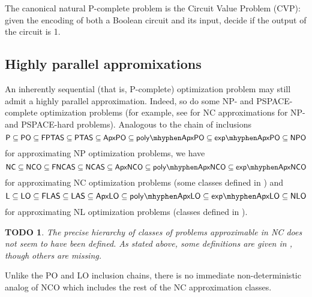 \documentclass{article}
\newtheorem{todo}{TODO}
\begin{document}
The canonical natural \textsf{P}-complete problem is the Circuit Value Problem (CVP): given the encoding of both a Boolean circuit and its input, decide if the output of the circuit is 1.

\subsection{Highly parallel appromixations}

An inherently sequential (that is, \textsf{P}-complete) optimization problem may still admit a highly parallel approximation.
Indeed, so do some \textsf{NP}- and \textsf{PSPACE}-complete optimization problems (for example, see \cite{hmrrrs98} for \textsf{NC} approximations for \textsf{NP}- and \textsf{PSPACE}-hard problems).
Analogous to the chain of inclusions
\begin{displaymath}
  \mathsf{P} \subseteq \mathsf{PO} \subseteq \mathsf{FPTAS} \subseteq \mathsf{PTAS} \subseteq \mathsf{ApxPO} \subseteq \mathsf{poly\mhyphen ApxPO} \subseteq \mathsf{exp\mhyphen ApxPO} \subseteq \mathsf{NPO}
\end{displaymath}
for approximating \textsf{NP} optimization problems, we have
\begin{displaymath}
  \mathsf{NC} \subseteq \mathsf{NCO} \subseteq \mathsf{FNCAS} \subseteq \mathsf{NCAS} \subseteq \mathsf{ApxNCO} \subseteq \mathsf{poly\mhyphen ApxNCO} \subseteq \mathsf{exp\mhyphen ApxNCO}
\end{displaymath}
for approximating \textsf{NC} optimization problems (some classes defined in \cite{dsst97}) and
\begin{displaymath}
  \mathsf{L} \subseteq \mathsf{LO} \subseteq \mathsf{FLAS} \subseteq \mathsf{LAS} \subseteq \mathsf{ApxLO} \subseteq \mathsf{poly\mhyphen ApxLO} \subseteq \mathsf{exp\mhyphen ApxLO} \subseteq \mathsf{NLO}
\end{displaymath}
for approximating \textsf{NL} optimization problems (classes defined in \cite{tantau07}).

\begin{todo}
  The precise hierarchy of classes of problems approximable in \textsf{NC} does not seem to have been defined.
  As stated above, some definitions are given in \cite{dsst97}, though others are missing.
\end{todo}

Unlike the \textsf{PO} and \textsf{LO} inclusion chains, there is no immediate non-deterministic analog of \textsf{NCO} which includes the rest of the \textsf{NC} approximation classes.
\end{document}

